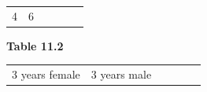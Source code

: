 \begin{enumerate}[noitemsep, label=\textbf{\arabic*}. ]
{{\begin{center}
\begin{tabular}[t]{|l|l|l|l|l|l|}
    
        4 &
    
    
        6%
     \tabularnewline\cline{1-1}\cline{2-2}\cline{3-3}\cline{4-4}\cline{5-5}\cline{6-6}
    \end{tabular}
      \end{center}
    \begin{center}{\small\bfseries Table 11.2}\end{center}
    
    \addtocounter{footnote}{-0}
    
          }{ %
        
    
        \begin{center}
      
      \label{m39377*id115116}
      
    \noindent
      \tablelasttail{}
      \begin{xtabular}[t]{|l|l|l|l|l|l|}\hline
    
    
        3 years
female &
    
    
        3 years male &
    

\end{xtabular}
\end{center}}}
\end{enumerate}
